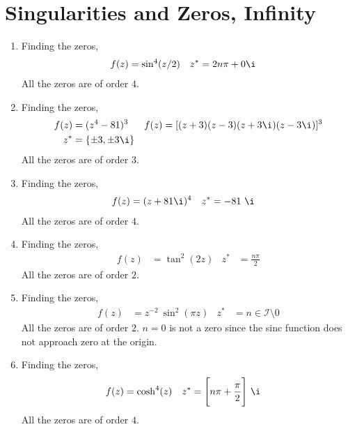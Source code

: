\section{Singularities and Zeros, Infinity}

\begin{enumerate}
    \item Finding the zeros,
          \begin{align}
              f(z) & = \sin^4(z/2) &
              z^*  & = 2n\pi + 0\i
          \end{align}
          All the zeros are of order $ 4 $.

    \item Finding the zeros,
          \begin{align}
              f(z) & = (z^4 - 81)^3                 &
              f(z) & = [(z+3)(z-3)(z+3\i)(z-3\i)]^3   \\
              z^*  & = \{\pm 3, \pm 3\i\}
          \end{align}
          All the zeros are of order $ 3 $.

    \item Finding the zeros,
          \begin{align}
              f(z) & = (z + 81\i)^4 &
              z^*  & = -81\ \i
          \end{align}
          All the zeros are of order $ 4 $.

    \item Finding the zeros,
          \begin{align}
              f(z) & = \tan^2(2z)     &
              z^*  & = \frac{n\pi}{2}
          \end{align}
          All the zeros are of order $ 2 $.

    \item Finding the zeros,
          \begin{align}
              f(z) & = z^{-2}\ \sin^2(\pi z)         &
              z^*  & = n \in \mathcal{I} \setminus 0
          \end{align}
          All the zeros are of order $ 2 $. $ n = 0 $ is not a zero since the sinc
          function does not approach zero at the origin.

    \item Finding the zeros,
          \begin{align}
              f(z) & = \cosh^4(z)                           &
              z^*  & = \Bigg[n\pi + \frac{\pi}{2}\Bigg]\ \i
          \end{align}
          All the zeros are of order $ 4 $.


\end{enumerate}

